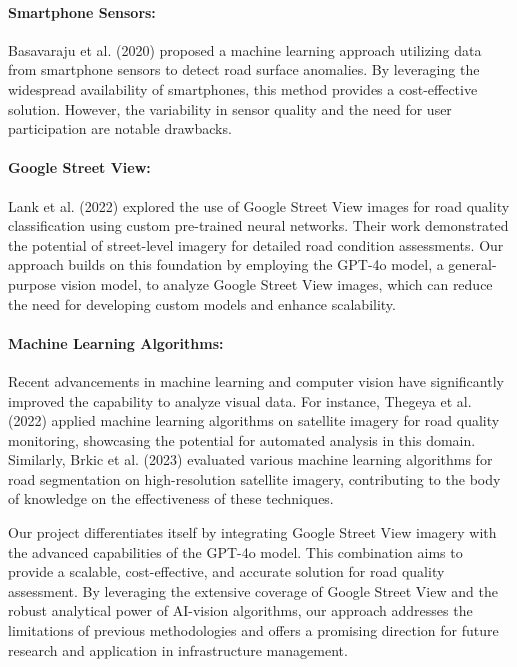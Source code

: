 \documentclass{article}
\begin{document}
\paragraph{Smartphone Sensors:}
Basavaraju et al. (2020) proposed a machine learning approach utilizing data from smartphone sensors to detect road surface anomalies. By leveraging the widespread availability of smartphones, this method provides a cost-effective solution. However, the variability in sensor quality and the need for user participation are notable drawbacks.

\paragraph{Google Street View:}
Lank et al. (2022) explored the use of Google Street View images for road quality classification using custom pre-trained neural networks. Their work demonstrated the potential of street-level imagery for detailed road condition assessments. Our approach builds on this foundation by employing the GPT-4o model, a general-purpose vision model, to analyze Google Street View images, which can reduce the need for developing custom models and enhance scalability.

\paragraph{Machine Learning Algorithms:}
Recent advancements in machine learning and computer vision have significantly improved the capability to analyze visual data. For instance, Thegeya et al. (2022) applied machine learning algorithms on satellite imagery for road quality monitoring, showcasing the potential for automated analysis in this domain. Similarly, Brkic et al. (2023) evaluated various machine learning algorithms for road segmentation on high-resolution satellite imagery, contributing to the body of knowledge on the effectiveness of these techniques.

Our project differentiates itself by integrating Google Street View imagery with the advanced capabilities of the GPT-4o model. This combination aims to provide a scalable, cost-effective, and accurate solution for road quality assessment. By leveraging the extensive coverage of Google Street View and the robust analytical power of AI-vision algorithms, our approach addresses the limitations of previous methodologies and offers a promising direction for future research and application in infrastructure management.
\end{document}
